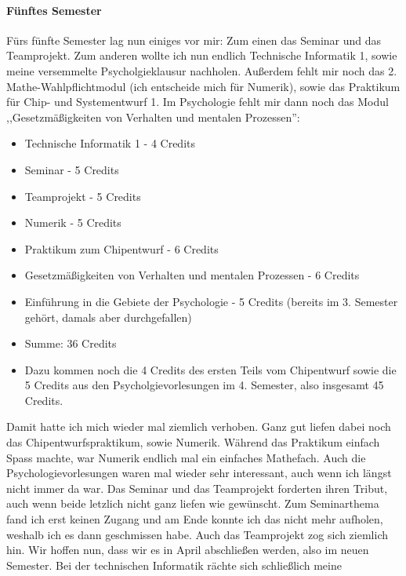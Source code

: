 \paragraph{Fünftes Semester}
Fürs fünfte Semester lag nun einiges vor mir: Zum einen das Seminar
und das Teamprojekt. Zum anderen wollte ich nun 
endlich Technische Informatik 1, sowie meine versemmelte Psycholgieklausur nachholen. Außerdem fehlt mir
noch das 2. Mathe-Wahlpflichtmodul (ich entscheide mich für Numerik), sowie  das Praktikum für Chip-
und Systementwurf 1. Im Psychologie fehlt mir dann noch das Modul ,,Gesetzmäßigkeiten von Verhalten und mentalen Prozessen'':
\begin{itemize}
\item Technische Informatik 1 - 4 Credits
\item Seminar - 5 Credits
\item Teamprojekt - 5 Credits
\item Numerik - 5 Credits
\item Praktikum zum Chipentwurf - 6 Credits
\item Gesetzmäßigkeiten von Verhalten und mentalen Prozessen - 6
  Credits
\item Einführung in die Gebiete der Psychologie - 5 Credits (bereits
  im 3. Semester gehört, damals aber durchgefallen)
\item Summe: 36 Credits
\item Dazu kommen noch die 4 Credits des ersten Teils vom Chipentwurf
 sowie die 5 Credits aus den Psycholgievorlesungen im 4. Semester,
 also insgesamt 45 Credits.
\end{itemize}
Damit hatte ich mich wieder mal ziemlich verhoben. Ganz gut liefen
dabei noch das Chipentwurfspraktikum, sowie Numerik. Während das
Praktikum einfach Spass machte, war Numerik endlich mal ein einfaches
Mathefach. Auch die Psychologievorlesungen waren mal wieder sehr
interessant, auch wenn ich längst nicht immer da war.  Das Seminar und
das Teamprojekt forderten ihren Tribut, auch wenn beide letzlich nicht
ganz liefen wie gewünscht. Zum Seminarthema fand ich erst keinen
Zugang und am Ende konnte ich das nicht mehr aufholen, weshalb ich es
dann geschmissen habe. Auch das Teamprojekt zog sich ziemlich hin. Wir
hoffen nun, dass wir es in April abschließen werden, also im neuen
Semester. Bei der technischen Informatik rächte sich schließlich meine
